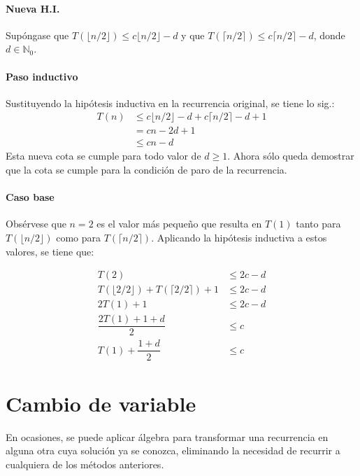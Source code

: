 \begin{expl}
    \paragraph{Nueva H.I.}
    Supóngase que $T(\lfloor n/2\rfloor)\leq c\lfloor n/2\rfloor-d$ 
    y que $T(\lceil n/2\rceil)\leq c\lceil n/2\rceil-d$, donde $d\in\mathbb{N}_{0}$.
    
    \paragraph{Paso inductivo}
    Sustituyendo la hipótesis inductiva en la recurrencia original, se tiene lo sig.:
    \begin{align*}
        T(n) &\leq c\lfloor n/2\rfloor-d+c\lceil n/2\rceil-d+1\\
	    &=cn-2d+1\\
	    &\leq cn-d
    \end{align*}
    Esta nueva cota se cumple para todo valor de $d\geq 1$. Ahora sólo queda demostrar
    que la cota se cumple para la condición de paro de la recurrencia.
    
    \paragraph{Caso base}
    Obsérvese que $n=2$ es el valor más pequeño que resulta en $T(1)$ tanto para 
    $T(\lfloor n/2 \rfloor)$ como para $T(\lceil n/2 \rceil)$. Aplicando la hipótesis
    inductiva a estos valores, se tiene que:
    
    \begin{align*}
        T(2) &\leq 2c-d\\
        T(\lfloor 2/2 \rfloor) + T(\lceil 2/2 \rceil) + 1 &\leq 2c-d \\
        2T(1) + 1 &\leq 2c - d \\
        \dfrac{2T(1)+1+d}{2} &\leq c \\
        T(1) + \dfrac{1+d}{2} &\leq c
    \end{align*}
    \exend
\end{expl}

\section{Cambio de variable}

En ocasiones, se puede aplicar álgebra para transformar una recurrencia
en alguna otra cuya solución ya se conozca, eliminando
la necesidad de recurrir a cualquiera de los métodos anteriores.

